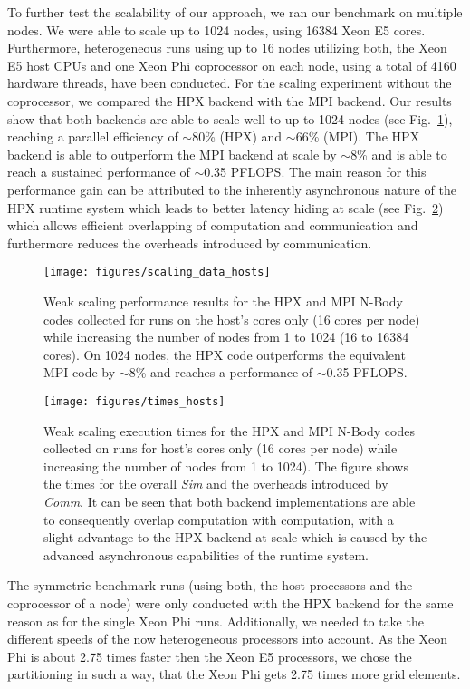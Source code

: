 \documentclass{sig-alternate}
\newcommand{\I}[1]{\textit{#1}}
\newcommand{\upp}{\vspace*{-0.5em}}
\newcommand{\up}{\vspace*{-0.25em}}
\begin{document}
To further test the scalability of our approach, we ran our benchmark on multiple
nodes. We were able to scale up to 1024 nodes, using 16384 Xeon E5 cores.
Furthermore, heterogeneous runs using up to 16 nodes utilizing both, the Xeon E5 host CPUs and one Xeon Phi
coprocessor on each node, using a total of 4160 hardware threads, have been conducted. For the
scaling experiment without the coprocessor, we compared the HPX backend with the
MPI backend. Our results show that both backends are able to scale well to up to
1024 nodes (see Fig.~\ref{fig:results_hosts}), reaching a parallel efficiency of
$\sim$80\% (HPX) and $\sim$66\% (MPI). The HPX backend is able to outperform the
MPI backend at scale by $\sim$8\% and is able to reach a sustained performance of
$\sim$0.35 PFLOPS. The main reason for this performance gain can be attributed to
the inherently asynchronous nature of the HPX runtime system which leads to
better latency hiding at scale (see Fig.~\ref{fig:times_hosts}) which allows
efficient overlapping of computation and communication and furthermore reduces
the overheads introduced by communication.
\begin{figure}[ht]
  \texttt{[image: figures/scaling\_data\_hosts]}
    \upp\upp
  \caption{Weak scaling performance results for the HPX and MPI N-Body codes collected for runs
    on the host's cores only (16 cores per node) while increasing the number of nodes from
    1 to 1024 (16 to 16384 cores). On 1024 nodes, the HPX code outperforms the equivalent
    MPI code by $\sim$8\% and reaches a performance of $\sim$0.35 PFLOPS.}
\label{fig:results_hosts}
\upp\upp
\end{figure}
\begin{figure}[ht]
  \texttt{[image: figures/times\_hosts]}
    \upp\upp
  \caption{Weak scaling execution times for the HPX and MPI N-Body codes collected on
    runs for host's cores only (16 cores per node) while increasing the number of
    nodes from 1 to 1024). The figure shows the times for the overall \I{Sim}
    and the overheads introduced by \I{Comm}. It can be seen that both
    backend implementations are able to consequently overlap computation with
    computation, with a slight advantage to the HPX backend at scale which is
    caused by the advanced asynchronous capabilities of the runtime system.}
  \label{fig:times_hosts}
\upp\upp\up
\end{figure}
The symmetric benchmark runs (using both, the host processors and the coprocessor
of a node) were only conducted with the HPX backend for the same reason as for the
single Xeon Phi runs. Additionally, we needed to take the different speeds of the
now heterogeneous processors into account. As the Xeon Phi is about 2.75 times
faster then the Xeon E5 processors, we chose the partitioning in such a way, that
the Xeon Phi gets 2.75 times more grid elements.
\end{document}
